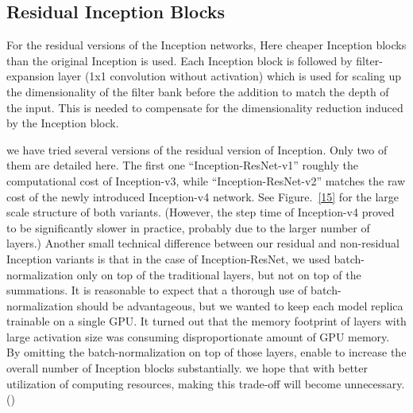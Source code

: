 \documentclass[a4paper,12pt, twoside]{NITKReport}
\begin{document}
\subsection{Residual Inception Blocks}
\par For the residual versions of the Inception networks, Here cheaper Inception  blocks than the original Inception is used. Each Inception block is followed by filter-expansion layer (1x1 convolution  without  activation) which is used  for scaling up the dimensionality of the filter bank before the addition to match the depth of the input. This is needed to compensate for the dimensionality reduction induced by the Inception block.
\par we have tried several versions of the residual version of Inception. Only  two  of them are detailed here. The first one “Inception-ResNet-v1” roughly the computational cost of Inception-v3, while “Inception-ResNet-v2” matches the raw cost of the newly introduced Inception-v4 network. See Figure.~\ref{15} for the large scale structure of both variants. (However, the step time of Inception-v4 proved to be significantly slower in practice, probably due to the larger number of layers.)
Another  small  technical  difference  between  our  residual and non-residual Inception variants is that in the case of Inception-ResNet, we used batch-normalization only on top of the traditional layers, but not on top of the summations. It is reasonable to expect that a thorough use of batch-normalization  should be advantageous, but we wanted to keep each model replica trainable on a single GPU. It turned out that the memory footprint of layers with large activation size was consuming disproportionate amount of GPU memory. By omitting the batch-normalization on top of those layers, enable to increase the overall number
of Inception blocks substantially. we hope that with better utilization of computing resources, making this trade-off will become unnecessary.(\cite{DBLP:journals/corr/SzegedyIV16})
\end{document}
